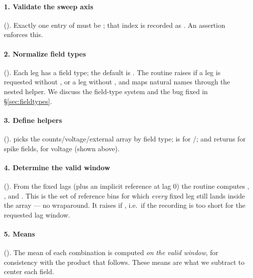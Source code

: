 \paragraph{1. Validate the sweep axis} ().
Exactly one entry of  must be ; that index is recorded
as . An assertion enforces this.

\paragraph{2. Normalize field types} ().
Each leg has a field type; the default is . The routine raises if a
 leg is requested without , or a  leg
without , and maps natural names through the nested
 helper. We discuss the field-type system and the
bug  fixed in \S\ref{sec:fieldtypes}.

\paragraph{3. Define helpers} ().
 picks the counts/voltage/external array by field type;
 is  for /; and
 returns  for spike fields,  for
voltage (shown above).

\paragraph{4. Determine the valid window} ().
From the fixed lags (plus an implicit reference at lag 0) the routine computes
, , and . This is the set of
reference bins for which \emph{every} fixed leg still lands inside the array --- no
wraparound. It raises if , i.e.\ if the
recording is too short for the requested lag window.

\paragraph{5. Means} (). The mean of each
 combination is computed \emph{on the valid window}, for
consistency with the product that follows. These means are what we subtract to
center each field.


